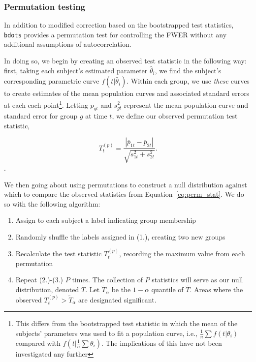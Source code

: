 \documentclass{article}
\newcommand{\xt}{\texttt}%
\begin{document}
\subsubsection{Permutation testing}

In addition to modified correction based on the bootstrapped test statistics, \xt{bdots} provides a permutation test for controlling the FWER without any additional assumptions of autocorrelation. 

In doing so, we begin by creating an observed test statistic in the following way: first, taking each subject's estimated parameter $\hat{\theta}_i$, we find the subject's corresponding parametric curve $f(t|\hat{\theta}_i)$. Within each group, we use \textit{these} curves to create estimates of the mean population curves and associated standard errors at each each point\footnote{This differs from the bootstrapped test statistic in which the mean of the subjects' parameters was used to fit a population curve, i.e., $\frac1n \sum f(t|\theta_i)$ compared with $f \left( t | \frac1n \sum \theta_i \right)$. The implications of this have not been investigated any further}. Letting $p_{gt}$ and $s_{gt}^2$ represent the mean population curve and standard error for group $g$ at time $t$, we define our observed permutation test statistic, 

\begin{equation}\label{eq:perm_stat}
T_t^{(p)} = \frac{|\overline{p}_{1t} - \overline{p}_{2t}|}{\sqrt{s_{1t}^2 + s_{2t}^2}}.
\end{equation}.

We then going about using permutations to construct a null distribution against which to compare the observed statistics from Equation~\ref{eq:perm_stat}. We do so with the following algorithm:

\begin{enumerate}
\item Assign to each subject a label indicating group membership
\item Randomly shuffle the labels assigned in (1.), creating two new groups 
\item Recalculate the test statistic $T^{(p)}_t$, recording the maximum value from each permutation
\item Repeat (2.)-(3.) $P$ times. The collection of $P$ statistics will serve as our null distribution, denoted $\widetilde{T}$. Let $\widetilde{T}_{\alpha}$ be the $1 - \alpha$ quantile of $\widetilde{T}$. Areas where the observed $T^{(p)}_t > \widetilde{T}_{\alpha}$ are designated significant.
\end{enumerate}
\end{document}
